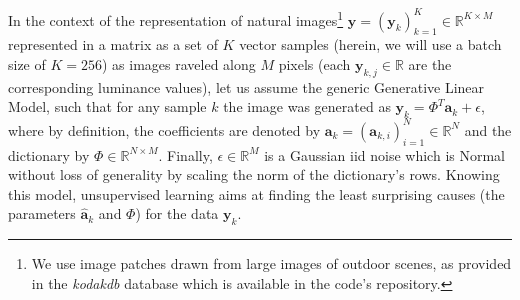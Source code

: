 \documentclass[draft]{article} %
\newcommand{\coef}{\mathbf{a}} %
\newcommand{\image}{\mathbf{y}} %
\newcommand{\dico}{\Phi} %
\newcommand{\eqdef}{\ensuremath{\stackrel{\mbox{\upshape\tiny def.}}{=}}}
\newcommand{\RR}{\mathbb{R}}
\begin{document}
In the context of the representation of natural images\footnote{We use image patches drawn from large images of outdoor scenes, as provided in the \emph{kodakdb} database which is available in the code's repository. %
} $\image = (\image_k)_{k=1}^K \in \RR^{K \times M}$ represented in a matrix as a set of $K$ vector samples (herein, we will use a batch size of $K=256$) as images raveled along $M$ pixels (each $\image_{k, j} \in \RR$ are the corresponding luminance values), let us assume the generic Generative Linear Model, such that for any sample $k$ the image was generated as $\image_k = \dico^T \coef_{k} + \epsilon $, where by definition, the coefficients are denoted by $\coef_{k} = (\coef_{k, i})_{i=1}^N \in \RR^{N}$ and the dictionary by $\dico \in \RR^{N \times M}$. Finally, $\epsilon \in \RR^{M}$ is a Gaussian iid noise which is Normal without loss of generality by scaling the norm of the dictionary's rows. Knowing this model, unsupervised learning aims at finding the least surprising causes (the parameters $\hat{\coef}_{k}$ and $\dico$) for the data $\image_k$.
\end{document}
